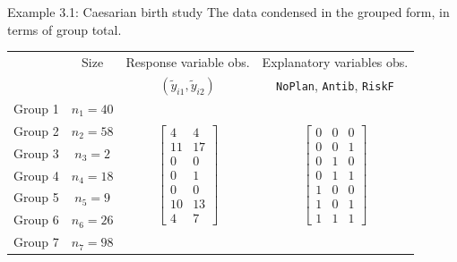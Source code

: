 \documentclass{beamer}
\begin{document}
\begin{frame}{Example 3.1: Caesarian birth study}
The data condensed in the grouped form, in terms of group total.
\begin{center}
\begin{tabular}{cccc}
& Size&  Response variable obs. & Explanatory variables obs.   \vspace*{8pt} \\
& & $(\tilde{y}_{i1}, \tilde{y}_{i2})$ & \texttt{NoPlan}, \texttt{Antib}, \texttt{RiskF}  \vspace*{10pt} \\
Group 1 & $n_1=40$ & \multirow{7}{*}{$\left[\!\begin{array}{cc} 4 & 4 \\
11 & 17 \\ 0 & 0 \\ 0 & 1 \\ 0 & 0 \\ 10 & 13 \\ 4 & 7 \end{array}\!\right]$} & 
\multirow{7}{*}{$\left[\!\begin{array}{ccc} 0 & 0 & 0 \\ 
0 & 0 & 1 \\ 0 & 1 & 0 \\ 0 & 1 & 1 \\ 1 & 0 & 0 \\ 1 & 0 & 1 \\ 1 & 1 & 1
\end{array}\!\right]$} \\ 
Group 2 & $n_2=58$ & & \\ Group 3 & $n_3=2$ & & \\ 
Group 4 & $n_4=18$ & & \\ Group 5 & $n_5=9$ & & \\ Group 6 & $n_6=26$ & &\\ Group 7 & $n_7=98$ & &
\end{tabular}
\end{center}
\end{frame}
\end{document}
